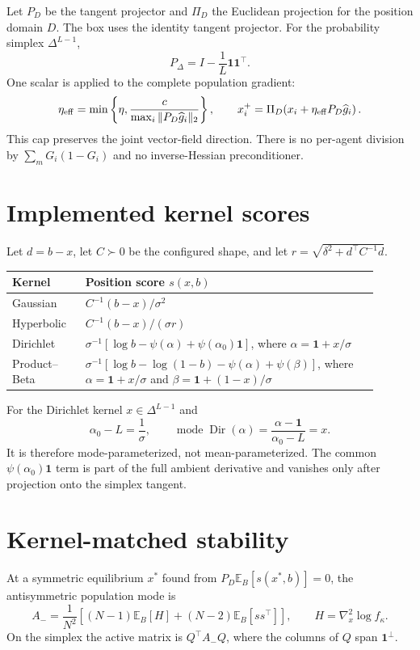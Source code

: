 \documentclass[11pt]{article}
\newcommand{\E}{\mathbb{E}}
\newcommand{\one}{\mathbf{1}}
\begin{document}
Let $P_D$ be the tangent projector and $\Pi_D$ the Euclidean projection for
the position domain $D$.  The box uses the identity tangent projector.  For
the probability simplex $\Delta^{L-1}$,
\[
P_\Delta=I-\frac1L\one\one^\top.
\]
One scalar is applied to the complete population gradient:
\[
\eta_{\rm eff}=\min\left\{\eta,
\frac{c}{\max_i\|P_D\widehat g_i\|_2}\right\},
\qquad
x_i^+=\Pi_D\!\left(x_i+\eta_{\rm eff}P_D\widehat g_i\right).
\]
This cap preserves the joint vector-field direction.  There is no per-agent
division by $\sum_mG_i(1-G_i)$ and no inverse-Hessian preconditioner.

\section{Implemented kernel scores}

Let $d=b-x$, let $C\succ0$ be the configured shape, and let
$r=\sqrt{\delta^2+d^\top C^{-1}d}$.
\begin{center}
\begin{tabular}{p{0.18\linewidth}p{0.72\linewidth}}
\toprule
Kernel & Position score $s(x,b)$ \\
\midrule
Gaussian & $C^{-1}(b-x)/\sigma^2$ \\
Hyperbolic & $C^{-1}(b-x)/(\sigma r)$ \\
Dirichlet & $\sigma^{-1}[\log b-\psi(\alpha)+\psi(\alpha_0)\one]$,
where $\alpha=\one+x/\sigma$ \\
Product--Beta & $\sigma^{-1}[\log b-\log(1-b)-\psi(\alpha)+\psi(\beta)]$,
where $\alpha=\one+x/\sigma$ and $\beta=\one+(1-x)/\sigma$ \\
\bottomrule
\end{tabular}
\end{center}

For the Dirichlet kernel $x\in\Delta^{L-1}$ and
\[
\alpha_0-L=\frac1\sigma,
\qquad
\operatorname{mode}\operatorname{Dir}(\alpha)
=\frac{\alpha-\one}{\alpha_0-L}=x.
\]
It is therefore mode-parameterized, not mean-parameterized.  The common
$\psi(\alpha_0)\one$ term is part of the full ambient derivative and vanishes
only after projection onto the simplex tangent.

\section{Kernel-matched stability}

At a symmetric equilibrium $x^*$ found from
$P_D\E_B[s(x^*,b)]=0$, the antisymmetric population mode is
\[
A_-=\frac{1}{N^2}\left[(N-1)\E_B[H]+(N-2)\E_B[ss^\top]\right],
\qquad H=\nabla_x^2\log f_\kappa.
\]
On the simplex the active matrix is $Q^\top A_-Q$, where the columns of $Q$
span $\one^\perp$.
\end{document}
